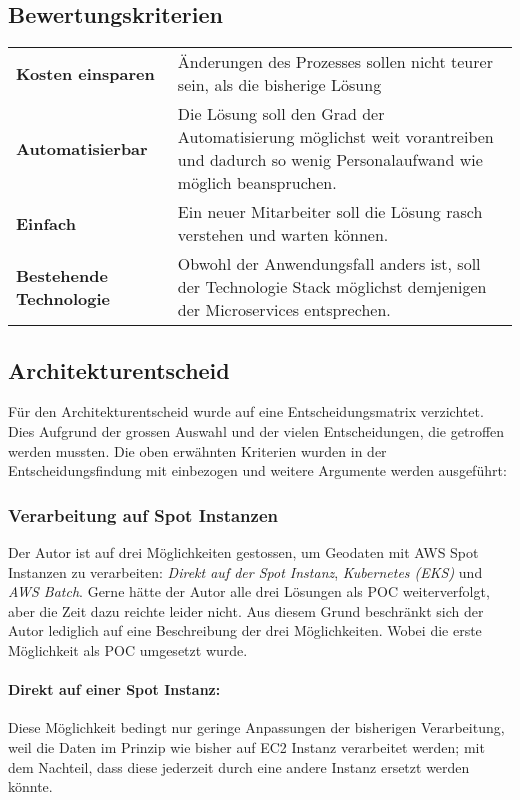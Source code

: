 \subsection{Bewertungskriterien}
\begin{tabular}{p{}p{}}
    \textbf{Kosten einsparen} & Änderungen des Prozesses sollen nicht teurer sein, als die bisherige Lösung\\
    \textbf{Automatisierbar} & Die Lösung soll den Grad der Automatisierung möglichst weit vorantreiben und dadurch so wenig Personalaufwand wie möglich beanspruchen.\\
    \textbf{Einfach} & Ein neuer Mitarbeiter soll die Lösung rasch verstehen und warten können.\\
    \textbf{Bestehende Technologie} & Obwohl der Anwendungsfall anders ist, soll der Technologie Stack möglichst demjenigen der Microservices entsprechen.\\
\end{tabular}

\subsection{Architekturentscheid}
Für den Architekturentscheid wurde auf eine Entscheidungsmatrix verzichtet. Dies Aufgrund der grossen Auswahl und der vielen Entscheidungen, die getroffen werden mussten. Die oben erwähnten Kriterien wurden in der Entscheidungsfindung mit einbezogen und weitere Argumente werden ausgeführt:

\subsubsection{Verarbeitung auf Spot Instanzen}
Der Autor ist auf drei Möglichkeiten gestossen, um Geodaten mit AWS Spot Instanzen zu verarbeiten: \emph{Direkt auf der Spot Instanz}, \emph{Kubernetes (EKS)} und \emph{AWS Batch}. Gerne hätte der Autor alle drei Lösungen als POC weiterverfolgt, aber die Zeit dazu reichte leider nicht. Aus diesem Grund beschränkt sich der Autor lediglich auf eine Beschreibung der drei Möglichkeiten. Wobei die erste Möglichkeit als POC umgesetzt wurde.

\paragraph{Direkt auf einer Spot Instanz:}
Diese Möglichkeit bedingt nur geringe Anpassungen der bisherigen Verarbeitung, weil die Daten im Prinzip wie bisher auf EC2 Instanz verarbeitet werden; mit dem Nachteil, dass diese jederzeit durch eine andere Instanz ersetzt werden könnte.

